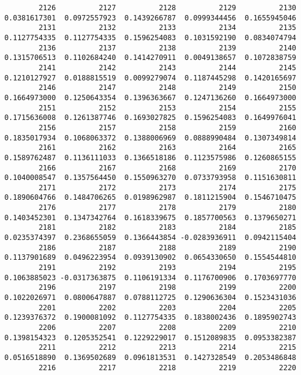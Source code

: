 \documentclass[
  letterpaper,
  DIV=11,
  numbers=noendperiod]{scrreprt}
\begin{document}
\begin{verbatim}
         2126          2127          2128          2129          2130 
 0.0381617301  0.0972557923  0.1439266787  0.0999344456  0.1655945046 
         2131          2132          2133          2134          2135 
 0.1127754335  0.1127754335  0.1596254083  0.1031592190  0.0834074794 
         2136          2137          2138          2139          2140 
 0.1315706513  0.1102684240  0.1414270911  0.0049138657  0.1072838759 
         2141          2142          2143          2144          2145 
 0.1210127927  0.0188815519  0.0099279074  0.1187445298  0.1420165697 
         2146          2147          2148          2149          2150 
 0.1664973000  0.1250643354  0.1396363667  0.1247136260  0.1664973000 
         2151          2152          2153          2154          2155 
 0.1715636008  0.1261387746  0.1693027825  0.1596254083  0.1649976041 
         2156          2157          2158          2159          2160 
 0.1835017934  0.1068063372  0.1388006969  0.0888990484  0.1307349814 
         2161          2162          2163          2164          2165 
 0.1589762487  0.1136111033  0.1366518186  0.1123575986  0.1260865155 
         2166          2167          2168          2169          2170 
 0.1040008547  0.1357564450  0.1550963270  0.0733793958  0.1151630811 
         2171          2172          2173          2174          2175 
 0.1890604766  0.1484706265  0.0198962987  0.1811215904  0.1546710475 
         2176          2177          2178          2179          2180 
 0.1403452301  0.1347342764  0.1618339675  0.1857700563  0.1379650271 
         2181          2182          2183          2184          2185 
 0.0235374397  0.2368655059  0.1366443854 -0.0283936911  0.0942115404 
         2186          2187          2188          2189          2190 
 0.1137901689  0.0496223954  0.0939130902  0.0654330650  0.1554544810 
         2191          2192          2193          2194          2195 
 0.1063885023 -0.0317363875  0.1106191334  0.1176700906  0.1703697770 
         2196          2197          2198          2199          2200 
 0.1022026971  0.0800647887  0.0788112725  0.1290636304  0.1523431036 
         2201          2202          2203          2204          2205 
 0.1239376372  0.1900081092  0.1127754335  0.1838002436  0.1895902743 
         2206          2207          2208          2209          2210 
 0.1398154323  0.1205352541  0.1229229017  0.1512089835  0.0953382387 
         2211          2212          2213          2214          2215 
 0.0516518890  0.1369502689  0.0961813531  0.1427328549  0.2053486848 
         2216          2217          2218          2219          2220 

\end{verbatim}
\end{document}
